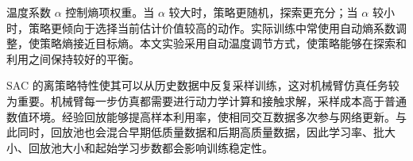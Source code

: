 \documentclass[
    type = bachelor,
    oneside,
    fontset = fandol
]{njuthesis}
\begin{document}
温度系数 $\alpha$ 控制熵项权重。当 $\alpha$ 较大时，策略更随机，探索更充分；当 $\alpha$ 较小时，策略更倾向于选择当前估计价值较高的动作。实际训练中常使用自动熵系数调整，使策略熵接近目标熵。本文实验采用自动温度调节方式，使策略能够在探索和利用之间保持较好的平衡。

SAC 的离策略特性使其可以从历史数据中反复采样训练，这对机械臂仿真任务较为重要。机械臂每一步仿真都需要进行动力学计算和接触求解，采样成本高于普通数值环境。经验回放能够提高样本利用率，使相同交互数据多次参与网络更新。与此同时，回放池也会混合早期低质量数据和后期高质量数据，因此学习率、批大小、回放池大小和起始学习步数都会影响训练稳定性。

\end{document}
